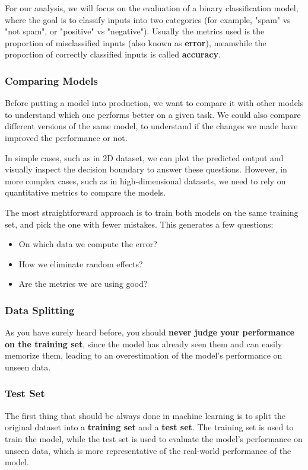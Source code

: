 For our analysis, we will focus on the evaluation of a binary classification model, 
where the goal is to classify inputs into two categories (for example, "spam" vs "not spam", or "positive" vs "negative").
Usually the metrics used is the proportion of misclassified inputs (also known as \textbf{error}),
meanwhile the proportion of correctly classified inputs is called \textbf{accuracy}.

\subsubsection{Comparing Models}
Before putting a model into production, we want to compare it with 
other models to understand which one performs better on a given task.
We could also compare different versions of the same model, to understand if the changes we made have improved the performance or not.

In simple cases, such as in 2D dataset, we can plot the predicted output and visually inspect the decision boundary to answer these questions.
However, in more complex cases, such as in high-dimensional datasets, we need to rely on quantitative metrics to compare the models.

The most straightforward approach is to train both models on the same training set, and pick the one with fewer mistakes.
This generates a few questions:
\begin{itemize}
    \item On which data we compute the error? 
    \item How we eliminate random effects? 
    \item Are the metrics we are using good?
\end{itemize}

\subsubsection{Data Splitting}
As you have surely heard before, you should \textbf{never judge your performance on the training set}, 
since the model has already seen them and can easily memorize them, leading to an overestimation of the model's performance on unseen data.

\subsubsection*{Test Set}
The first thing that should be always done in machine learning is to split the original dataset 
into a \textbf{training set} and a \textbf{test set}.
The training set is used to train the model, while the test set is used to evaluate the model's performance on unseen data,
which is more representative of the real-world performance of the model.

